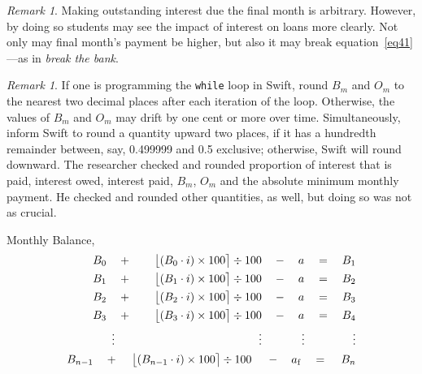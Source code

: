\documentclass[12pt,letterpaper,oneside]{article}
\theoremstyle{remark} %
\newtheorem{remark}[theorem]{Remark}
\begin{document}
	\begin{remark}
	Making outstanding interest due the final month is arbitrary. However, by doing so students may see the impact of interest on loans more clearly. Not only may final month's payment be higher, but also it may break equation~\ref{eq41}---as in \textit{break the bank}. 
	\end{remark}

	\vspace{12pt}
	\begin{remark}
	If one is programming the \texttt{while} loop in Swift, round $B_{m}$ and $O_{m}$ to the nearest two decimal places after each iteration of the loop. Otherwise, the values of $B_{m}$ and $O_{m}$ may drift by one cent or more over time. Simultaneously, inform Swift to round a quantity upward two places, if it has a hundredth remainder between, say, 0.499999 and 0.5 exclusive; otherwise, Swift will round downward. The researcher checked and rounded proportion of interest that is paid, interest owed, interest paid, $B_{m}$, $O_{m}$ and the absolute minimum monthly payment. He checked and rounded other quantities, as well, but doing so was not as crucial.
	\end{remark}

	\vspace{12pt}
	Monthly Balance,
	\small
	\begin{align}\label{eq41}
	B_{0}\quad +\qquad\big\lfloor{\left(B_{0}\cdot i\right)\times 100}\big\rceil\div 100\quad -\quad a\quad =\quad B_{1}\nonumber\\
	B_{1}\quad +\qquad\big\lfloor{\left(B_{1}\cdot i\right)\times 100}\big\rceil\div 100\quad -\quad a\quad =\quad B_{2}\nonumber\\
	B_{2}\quad +\qquad\big\lfloor{\left(B_{2}\cdot i\right)\times 100}\big\rceil\div 100\quad -\quad a\quad =\quad B_{3}\nonumber\\
	B_{3}\quad +\qquad\big\lfloor{\left(B_{3}\cdot i\right)\times 100}\big\rceil\div 100\quad -\quad a\quad =\quad B_{4}\nonumber\\
	\vdots\qquad\qquad\qquad\qquad\qquad\qquad\ \ \vdots\qquad\quad\,\ \vdots\qquad\quad\ \ \ \:\vdots\nonumber\\
	B_{n-1}\quad +\quad\,\big\lfloor{\left(B_{n-1}\cdot i\right)\times 100}\big\rceil\div 100\ \ \ \;-\ \ \ a_{\rm{f}}\quad =\ \ \ \,B_{n}
	\end{align}
	
\end{document}
